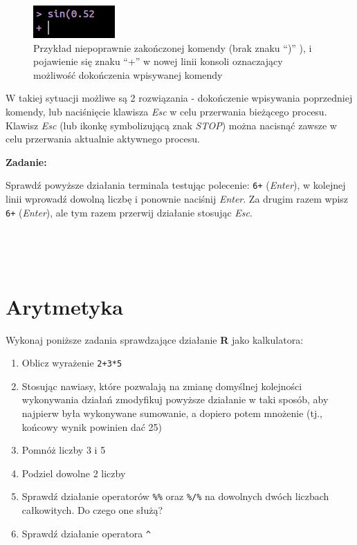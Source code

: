 \documentclass[]{book}
\providecommand{\tightlist}{%
  \setlength{\itemsep}{0pt}\setlength{\parskip}{0pt}}
\theoremstyle{definition}
\theoremstyle{definition}
\theoremstyle{definition}
\theoremstyle{remark}
\begin{document}
\begin{figure}
\centering
\includegraphics{figures/niedokonczona_komenda.png}
\caption{Przykład niepoprawnie zakończonej komendy (brak znaku ``)'' ),
i pojawienie się znaku ``+'' w nowej linii konsoli oznaczający możliwość
dokończenia wpisywanej komendy}
\end{figure}

W takiej sytuacji możliwe są 2 rozwiązania - dokończenie wpisywania
poprzedniej komendy, lub naciśnięcie klawisza \emph{Esc} w celu
przerwania bieżącego procesu. Klawisz \emph{Esc} (lub ikonkę
symbolizującą znak \emph{STOP}) można nacisnąć zawsze w celu przerwania
aktualnie aktywnego procesu.

\textbf{Zadanie:}

Sprawdź powyższe działania terminala testując polecenie: \texttt{6+}
(\emph{Enter}), w kolejnej linii wprowadź dowolną liczbę i ponownie
naciśnij \emph{Enter}. Za drugim razem wpisz \texttt{6+} (\emph{Enter}),
ale tym razem przerwij działanie stosując \emph{Esc}.

~

~

\section{Arytmetyka}\label{arytmetyka}

Wykonaj poniższe zadania sprawdzające działanie \textbf{R} jako
kalkulatora:

\begin{enumerate}
\def\labelenumi{\arabic{enumi}.}
\tightlist
\item
  Oblicz wyrażenie \texttt{2+3*5}
\item
  Stosując nawiasy, które pozwalają na zmianę domyślnej kolejności
  wykonywania działań zmodyfikuj powyższe działanie w taki sposób, aby
  najpierw była wykonywane sumowanie, a dopiero potem mnożenie (tj.,
  końcowy wynik powinien dać 25)
\item
  Pomnóż liczby 3 i 5
\item
  Podziel dowolne 2 liczby
\item
  Sprawdź działanie operatorów \texttt{\%\%} oraz \texttt{\%/\%} na
  dowolnych dwóch liczbach całkowitych. Do czego one służą?
\item
  Sprawdź działanie operatora \texttt{\^{}}
\end{enumerate}
\end{document}
